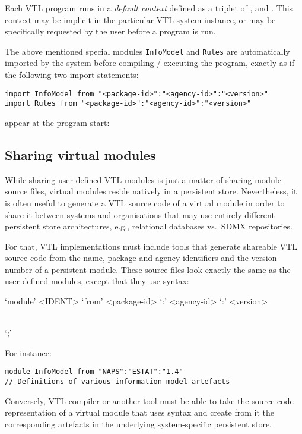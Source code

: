 \documentclass[droidmono,libertine,twoside,user,unofficial]{ecarticle}
\def\<#1>{\synt{#1}}
\newcommand{\optSemiCol}{\begin{stack}\\`;'\end{stack}}
\begin{document}
Each VTL program runs in a \emph{default context} defined as a triplet
of \<package-id>, \<agency-id> and \<version>.  This context may be
implicit in the particular VTL system instance, or may be specifically
requested by the user before a program is run.

The above mentioned special modules \texttt{InfoModel} and
\texttt{Rules} are automatically imported by the system before
compiling / executing the program, exactly as if the following two
import statements:
\begin{lstlisting}
import InfoModel from "<package-id>":"<agency-id>":"<version>"
import Rules from "<package-id>":"<agency-id>":"<version>"
\end{lstlisting}
appear at the program start:

\subsection{Sharing virtual modules}
\label{sec:shar-virt-modul}

While sharing user-defined VTL modules is just a matter of sharing
module source files, virtual modules reside natively in a persistent
store.  Nevertheless, it is often useful to generate a VTL source code
of a virtual module in order to share it between systems and
organisations that may use entirely different persistent store
architectures, e.g., relational databases vs.\ SDMX repositories.

For that, VTL implementations must include tools that generate
shareable VTL source code from the name, package and agency
identifiers and the version number of a persistent module.  These
source files look exactly the same as the user-defined modules, except
that they use  syntax:
\begin{syntdiag}
  `module' <IDENT> `from' <package-id> `:' <agency-id> `:' <version>
  \optSemiCol
\end{syntdiag}
For instance:
\begin{lstlisting}
module InfoModel from "NAPS":"ESTAT":"1.4"
// Definitions of various information model artefacts
\end{lstlisting}

Conversely, VTL compiler or another tool must be able to take the
source code representation of a virtual module that uses
 syntax and create from it the corresponding
artefacts in the underlying system-specific persistent store.
\end{document}
